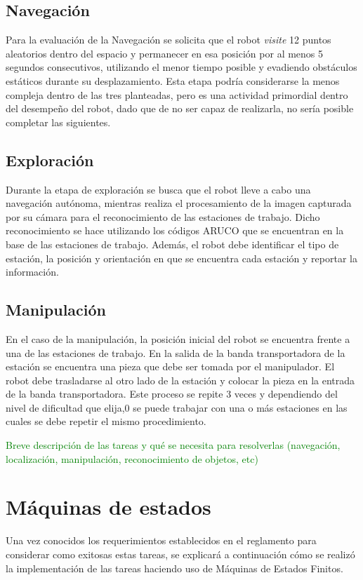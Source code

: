 \subsection{Navegación}
Para la evaluación de la Navegación se solicita que el robot \textit{visite} 12 puntos aleatorios dentro del espacio y permanecer en esa posición por al menos 5 segundos consecutivos, utilizando el menor tiempo posible y evadiendo obstáculos estáticos durante su desplazamiento.
Esta etapa podría considerarse la menos compleja dentro de las tres planteadas, pero es una actividad primordial dentro del desempeño del robot, dado que de no ser capaz de realizarla, no sería posible completar las siguientes.

\subsection{Exploración}
Durante la etapa de exploración se busca que el robot lleve a cabo una navegación autónoma, mientras realiza el procesamiento de la imagen capturada por su cámara para el reconocimiento de las estaciones de trabajo. Dicho reconocimiento se hace utilizando los códigos ARUCO que se encuentran en la base de las estaciones de trabajo. Además, el robot debe identificar el tipo de estación, la posición y orientación en que se encuentra cada estación y reportar la información.

\subsection{Manipulación}
En el caso de la manipulación, la posición inicial del robot se encuentra frente a una de las estaciones de trabajo. En la salida de la banda transportadora de la estación se encuentra una pieza que debe ser tomada por el manipulador. El robot debe trasladarse al otro lado de la estación y colocar la pieza en la entrada de la banda transportadora. Este proceso se repite 3 veces y dependiendo del nivel de dificultad que elija,0 se puede trabajar con una o más estaciones en las cuales se debe repetir el mismo procedimiento. 


\textcolor{green}{Breve descripción de las tareas y qué se necesita para resolverlas (navegación, localización, manipulación, reconocimiento de objetos, etc)}

\section{Máquinas de estados}
Una vez conocidos los requerimientos establecidos en el reglamento para considerar como exitosas estas tareas, se explicará a continuación cómo se realizó la implementación de las tareas haciendo uso de Máquinas de Estados Finitos.

